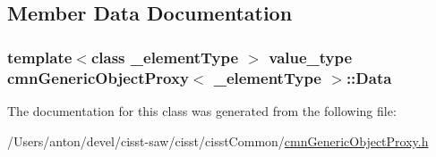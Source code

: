 \subsection{Member Data Documentation}
\hypertarget{classcmn_generic_object_proxy_a1c215839c40dbb71a7e2609b71a80f71}{}
\subsubsection[{Data}]{\setlength{\rightskip}{0pt plus 5cm}template$<$class \+\_\+element\+Type $>$ {\bf value\+\_\+type} {\bf cmn\+Generic\+Object\+Proxy}$<$ \+\_\+element\+Type $>$\+::Data}\label{classcmn_generic_object_proxy_a1c215839c40dbb71a7e2609b71a80f71}


The documentation for this class was generated from the following file\+:\begin{DoxyCompactItemize}
\item 
/\+Users/anton/devel/cisst-\/saw/cisst/cisst\+Common/\hyperlink{cmn_generic_object_proxy_8h}{cmn\+Generic\+Object\+Proxy.\+h}\end{DoxyCompactItemize}
